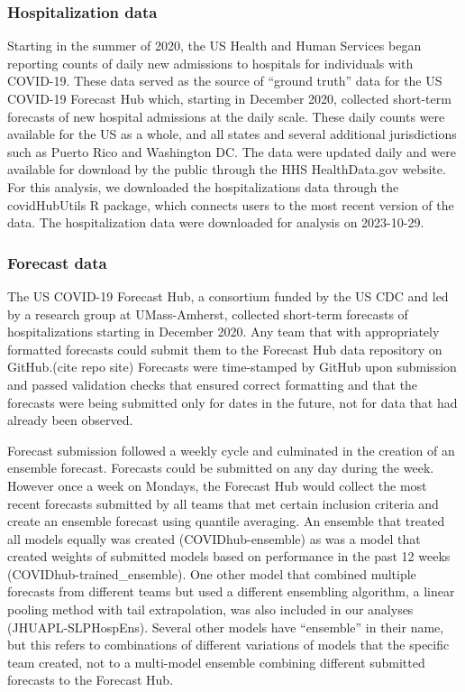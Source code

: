 \documentclass{article}\usepackage[]{graphicx}\usepackage[]{xcolor}
\begin{document}
\subsubsection{Hospitalization data}
Starting in the summer of 2020, the US Health and Human Services began reporting counts of daily new admissions to hospitals for individuals with COVID-19.\citep{healthdatagov_covid-19_nodate}
These data served as the source of ``ground truth'' data for the US COVID-19 Forecast Hub which, starting in December 2020, collected short-term forecasts of new hospital admissions at the daily scale.
These daily counts were available for the US as a whole, and all states and several additional jurisdictions such as Puerto Rico and Washington DC.
The data were updated daily and were available for download by the public through the HHS HealthData.gov website.
For this analysis, we downloaded the hospitalizations data through the covidHubUtils R package, which connects users to the most recent version of the data.\cite{wang-covidhubutils}
The hospitalization data were downloaded for analysis on 2023-10-29.

\subsubsection{Forecast data}
The US COVID-19 Forecast Hub, a consortium funded by the US CDC and led by a research group at UMass-Amherst, collected short-term forecasts of hospitalizations starting in December 2020.\citep{cramer_united_2022}
Any team that with appropriately formatted forecasts could submit them to the Forecast Hub data repository on GitHub.(cite repo site)
Forecasts were time-stamped by GitHub upon submission and passed validation checks that ensured correct formatting and that the forecasts were being submitted only for dates in the future, not for data that had already been observed.

Forecast submission followed a weekly cycle and culminated in the creation of an ensemble forecast.
Forecasts could be submitted on any day during the week.
However once a week on Mondays, the Forecast Hub would collect the most recent forecasts submitted by all teams that met certain inclusion criteria and create an ensemble forecast using quantile averaging.\citep{ray_comparing_2023}
An ensemble that treated all models equally was created (COVIDhub-ensemble) as was a model that created weights of submitted models based on performance in the past 12 weeks (COVIDhub-trained\_ensemble).
One other model that combined multiple forecasts from different teams but used a different ensembling algorithm, a linear pooling method with tail extrapolation, was also included in our analyses (JHUAPL-SLPHospEns).
Several other models have ``ensemble'' in their name, but this refers to combinations of different variations of models that the specific team created, not to a multi-model ensemble combining different submitted forecasts to the Forecast Hub.
\end{document}

